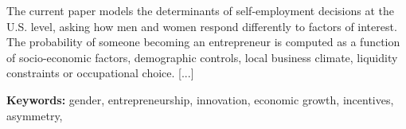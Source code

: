 The current paper models the determinants of self-employment decisions at the U.S. level, asking how men and women respond differently to factors of interest. The probability of someone becoming an entrepreneur is computed as a function of  socio-economic factors, demographic controls, local business climate, liquidity constraints or occupational choice. [...] 

\textbf{Keywords:} gender, entrepreneurship, innovation, economic growth, incentives, asymmetry, 

